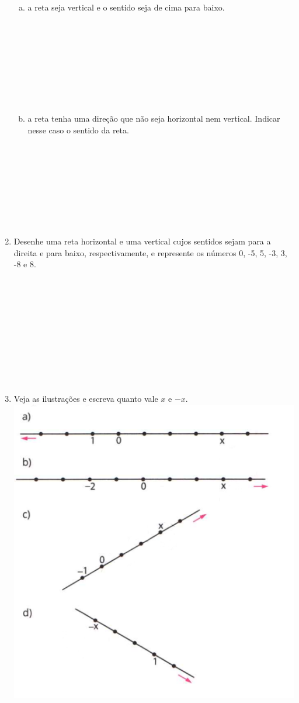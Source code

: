 \documentclass[a4paper,14pt]{article}
\begin{document}
\begin{multicols}{2}
\begin{enumerate}
\begin{enumerate}[a)]
				\item a reta seja vertical e o sentido seja de cima para baixo. \\\\\\\\\\\\\\\\\\
				\item a reta tenha uma direção que não seja horizontal nem vertical. Indicar nesse caso o sentido da reta. \\\\\\\\\\\\\\\\\\
			\end{enumerate}	
			\item Desenhe uma reta horizontal e uma vertical cujos sentidos sejam para a direita e para baixo, respectivamente, e represente os números 0, -5, 5, -3, 3, -8 e 8. \\\\\\\\\\\\\\\\\\\\\\
			\item Veja as ilustrações e escreva quanto vale $x$ e $-x$. \\
			\includegraphics[width=1.2\linewidth]{6FMA20_imagens/imagem1}

\end{enumerate}
\end{multicols}
\end{document}
